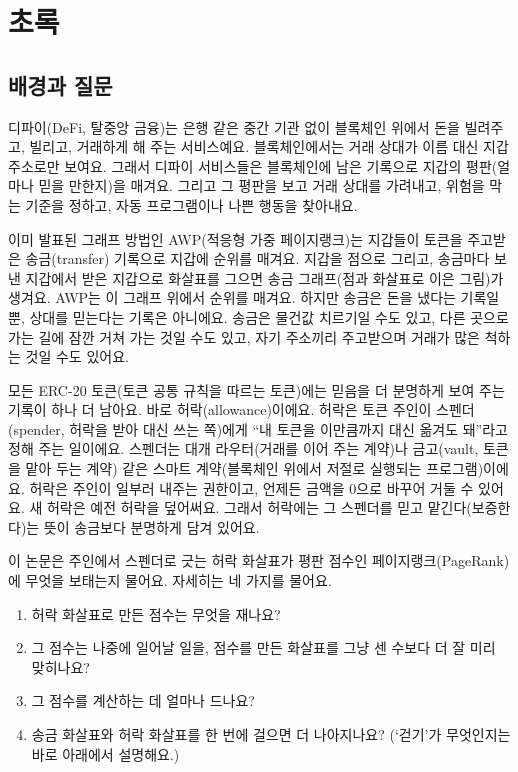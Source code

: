 
\chapter*{초록}

\label{ch:abstract}

\section*{배경과 질문}

디파이(DeFi, 탈중앙 금융)는 은행 같은 중간 기관 없이 블록체인 위에서 돈을 빌려주고, 빌리고, 거래하게 해 주는 서비스예요. 블록체인에서는 거래 상대가 이름 대신 지갑 주소로만 보여요. 그래서 디파이 서비스들은 블록체인에 남은 기록으로 지갑의 평판(얼마나 믿을 만한지)을 매겨요. 그리고 그 평판을 보고 거래 상대를 가려내고, 위험을 막는 기준을 정하고, 자동 프로그램이나 나쁜 행동을 찾아내요.

이미 발표된 그래프 방법인 AWP(적응형 가중 페이지랭크)는 지갑들이 토큰을 주고받은 송금(transfer) 기록으로 지갑에 순위를 매겨요. 지갑을 점으로 그리고, 송금마다 보낸 지갑에서 받은 지갑으로 화살표를 그으면 송금 그래프(점과 화살표로 이은 그림)가 생겨요. AWP는 이 그래프 위에서 순위를 매겨요. 하지만 송금은 돈을 냈다는 기록일 뿐, 상대를 믿는다는 기록은 아니에요. 송금은 물건값 치르기일 수도 있고, 다른 곳으로 가는 길에 잠깐 거쳐 가는 것일 수도 있고, 자기 주소끼리 주고받으며 거래가 많은 척하는 것일 수도 있어요.

모든 ERC-20 토큰(토큰 공통 규칙을 따르는 토큰)에는 믿음을 더 분명하게 보여 주는 기록이 하나 더 남아요. 바로 허락(allowance)이에요. 허락은 토큰 주인이 스펜더(spender, 허락을 받아 대신 쓰는 쪽)에게 “내 토큰을 이만큼까지 대신 옮겨도 돼”라고 정해 주는 일이에요. 스펜더는 대개 라우터(거래를 이어 주는 계약)나 금고(vault, 토큰을 맡아 두는 계약) 같은 스마트 계약(블록체인 위에서 저절로 실행되는 프로그램)이에요. 허락은 주인이 일부러 내주는 권한이고, 언제든 금액을 0으로 바꾸어 거둘 수 있어요. 새 허락은 예전 허락을 덮어써요. 그래서 허락에는 그 스펜더를 믿고 맡긴다(보증한다)는 뜻이 송금보다 분명하게 담겨 있어요.

이 논문은 주인에서 스펜더로 긋는 허락 화살표가 평판 점수인 페이지랭크(PageRank)에 무엇을 보태는지 물어요. 자세히는 네 가지를 물어요.
\begin{enumerate}
\item 허락 화살표로 만든 점수는 무엇을 재나요?
\item 그 점수는 나중에 일어날 일을, 점수를 만든 화살표를 그냥 센 수보다 더 잘 미리 맞히나요?
\item 그 점수를 계산하는 데 얼마나 드나요?
\item 송금 화살표와 허락 화살표를 한 번에 걸으면 더 나아지나요? (‘걷기’가 무엇인지는 바로 아래에서 설명해요.)
\end{enumerate}

